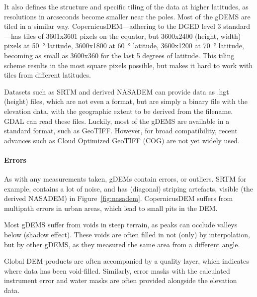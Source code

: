 It also defines the structure and specific tiling of the data at higher latitudes, as resolutions in arcseconds become smaller near the poles.
Most of the gDEMS are tiled in a similar way.
CopernicusDEM---adhering to the DGED level 3 standard---has tiles of 3601x3601 pixels on the equator, but 3600x2400 (height, width) pixels at \qty{50}{\degree} latitude, 3600x1800 at \qty{60}{\degree} latitude, 3600x1200 at \qty{70}{\degree} latitude, becoming as small as 3600x360 for the last 5 degrees of latitude.
This tiling scheme results in the most square pixels possible, but makes it hard to work with tiles from different latitudes.

Datasets such as SRTM and derived NASADEM can provide data as .hgt (height) files, which are not even a format, but are simply a binary file with the elevation data, with the geographic extent to be derived from the filename.
GDAL can read these files.
Luckily, most of the gDEMS are available in a standard format, such as GeoTIFF.
However, for broad compatibility, recent advances such as Cloud Optimized GeoTIFF (COG) are not yet widely used.


\paragraph{Errors}
As with any measurements taken, gDEMs contain errors, or outliers.
SRTM for example, contains a lot of noise, and has (diagonal) striping artefacts, visible (the derived NASADEM) in Figure~\ref{fig:nasadem}.
CopernicusDEM suffers from multipath errors in urban areas, which lead to small pits in the DEM.

Most gDEMS suffer from voids in steep terrain, as peaks can occlude valleys below (shadow effect).
These voids are often filled in not (only) by interpolation, but by other gDEMS, as they measured the same area from a different angle.


Global DEM products are often accompanied by a quality layer, which indicates where data has been void-filled.
Similarly, error masks with the calculated instrument error and water masks are often provided alongside the elevation data.



